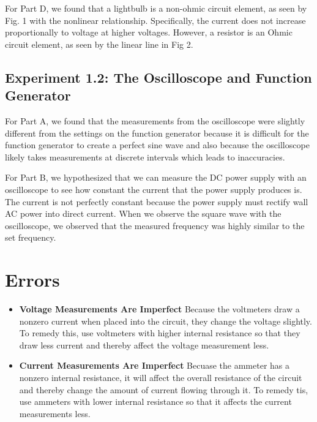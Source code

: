 \documentclass[10pt]{article}
\begin{document}
	For Part D, we found that a lightbulb is a non-ohmic circuit element, as seen by Fig. 1 with the nonlinear relationship. Specifically, the current does not increase proportionally to voltage at higher voltages. 
	However, a resistor is an Ohmic circuit element, as seen by the linear line in Fig 2.
	
	\subsection{Experiment 1.2: The Oscilloscope and Function Generator}
	For Part A, we found that the measurements from the oscilloscope were slightly different from the settings on the function generator because it is difficult for the function generator to create a perfect sine wave and also because the oscilloscope likely takes measurements at discrete intervals which leads to inaccuracies. \newline
	
	For Part B, we hypothesized that we can measure the DC power supply with an oscilloscope to see how constant the current that the power supply produces is. The current is not perfectly constant because the power supply must rectify wall AC power into direct current. When we observe the square wave with the oscilloscope, we observed that the measured frequency was highly similar to the set frequency. 
	
	
	\medskip
	
	
	\section{Errors}
	
	
	
	\medskip
	
	
	\begin{itemize}
		\item \textbf{Voltage Measurements Are Imperfect} Because the voltmeters draw a nonzero current when placed into the circuit, they change the voltage slightly. To remedy this, use voltmeters with higher internal resistance so that they draw less current and thereby affect the voltage measurement less. 
		\item \textbf{Current Measurements Are Imperfect} Becuase the ammeter has a nonzero internal resistance, it will affect the overall resistance of the circuit and thereby change the amount of current flowing through it. To remedy tis, use ammeters with lower internal resistance so that it affects the current measurements less. 
	\end{itemize}
	
\end{document}
